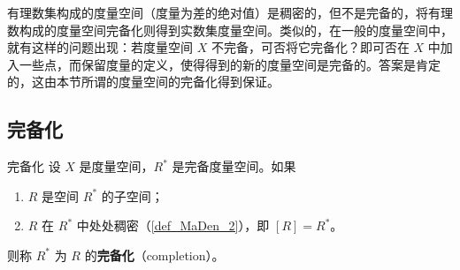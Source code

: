 
有理数集构成的度量空间（度量为差的绝对值）是稠密的，但不是完备的，将有理数构成的度量空间完备化则得到实数集度量空间。类似的，在一般的度量空间中，就有这样的问题出现：若度量空间 $X$ 不完备，可否将它完备化？即可否在 $X$ 中加入一些点，而保留度量的定义，使得得到的新的度量空间是完备的。答案是肯定的，这由本节所谓的度量空间的完备化得到保证。

\subsection{完备化}
\begin{definition}{完备化}
设 $X$ 是度量空间，$R^*$ 是完备度量空间。如果
\begin{enumerate}
\item $R$ 是空间 $R^*$ 的子空间；
\item $R$ 在 $R^*$ 中处处稠密（\autoref{def_MaDen_2}），即 $[R]=R^*$。
\end{enumerate}
则称 $R^*$ 为 $R$ 的\textbf{完备化}（completion）。
\end{definition}

